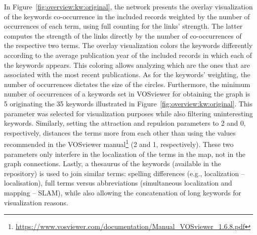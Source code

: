 In Figure~\ref{fig:overview:kw:original}, the network presents the overlay visualization of the keywords co-occurrence in the included records weighted by the number of occurrences of each term, using full counting for the links' strength. The latter computes the strength of the links directly by the number of co-occurrences of the respective two terms.
The overlay visualization colors the keywords differently according to the average publication year of the included records in which each of the keywords appears. This coloring allows analyzing which are the ones that are associated with the most recent publications.
As for the keywords' weighting, the number of occurrences dictates the size of the circles.
Furthermore, the minimum number of occurrences of a keywords set in VOSviewer for obtaining the graph is 5 originating the 35 keywords illustrated in Figure~\ref{fig:overview:kw:original}. This parameter was selected for visualization purposes while also filtering uninteresting keywords.
Similarly, setting the attraction and repulsion parameters to 2 and 0, respectively, distances the terms more from each other than using the values recommended in the VOSviewer manual\footnote{\url{https://www.vosviewer.com/documentation/Manual_VOSviewer_1.6.8.pdf}} (2 and 1, respectively). These two parameters only interfere in the localization of the terms in the map, not in the graph connections.
Lastly, a thesaurus of the keywords (available in the repository) is used to join similar terms: spelling differences (e.g., localization -- localisation), full terms versus abbreviations (simultaneous localization and mapping -- SLAM), while also allowing the concatenation of long keywords for visualization reasons.

